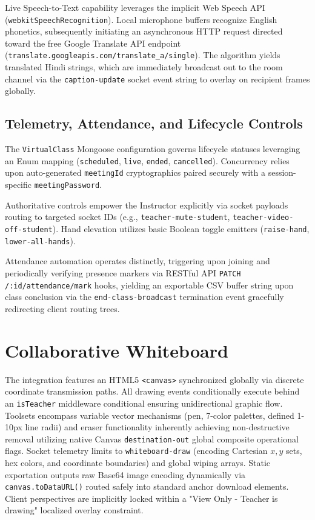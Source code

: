 \documentclass[12pt, journal, onecolumn]{IEEEtran}
\begin{document}
Live Speech-to-Text capability leverages the implicit Web Speech API (\texttt{webkitSpeechRecognition}). Local microphone buffers recognize English phonetics, subsequently initiating an asynchronous HTTP request directed toward the free Google Translate API endpoint (\texttt{translate.googleapis.com/translate\_a/single}). The algorithm yields translated Hindi strings, which are immediately broadcast out to the room channel via the \texttt{caption-update} socket event string to overlay on recipient frames globally.

\subsection{Telemetry, Attendance, and Lifecycle Controls}
The \texttt{VirtualClass} Mongoose configuration governs lifecycle statuses leveraging an Enum mapping (\texttt{scheduled}, \texttt{live}, \texttt{ended}, \texttt{cancelled}). Concurrency relies upon auto-generated \texttt{meetingId} cryptographics paired securely with a session-specific \texttt{meetingPassword}.

Authoritative controls empower the Instructor explicitly via socket payloads routing to targeted socket IDs (e.g., \texttt{teacher-mute-student}, \texttt{teacher-video-off-student}). Hand elevation utilizes basic Boolean toggle emitters (\texttt{raise-hand}, \texttt{lower-all-hands}).

Attendance automation operates distinctly, triggering upon joining and periodically verifying presence markers via RESTful API \texttt{PATCH /:id/attendance/mark} hooks, yielding an exportable CSV buffer string upon class conclusion via the \texttt{end-class-broadcast} termination event gracefully redirecting client routing trees.

\section{Collaborative Whiteboard}
The integration features an HTML5 \texttt{<canvas>} synchronized globally via discrete coordinate transmission paths.
All drawing events conditionally execute behind an \texttt{isTeacher} middleware conditional ensuring unidirectional graphic flow.
Toolsets encompass variable vector mechanisms (pen, 7-color palettes, defined 1-10px line radii) and eraser functionality inherently achieving non-destructive removal utilizing native Canvas \texttt{destination-out} global composite operational flags.
Socket telemetry limits to \texttt{whiteboard-draw} (encoding Cartesian $x, y$ sets, hex colors, and coordinate boundaries) and global wiping arrays. Static exportation outputs raw Base64 image encoding dynamically via \texttt{canvas.toDataURL()} routed safely into standard anchor download elements. Client perspectives are implicitly locked within a "View Only - Teacher is drawing" localized overlay constraint.
\end{document}
